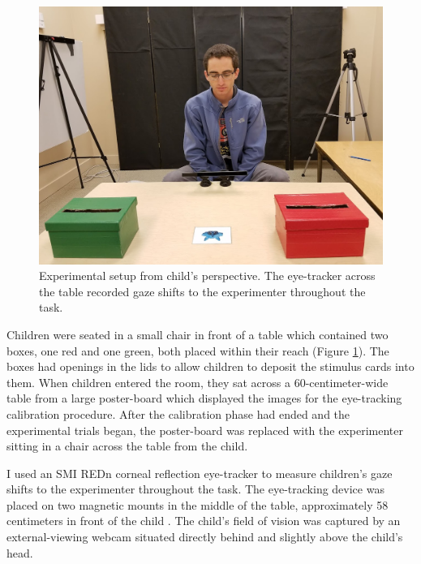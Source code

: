 \documentclass[floatsintext,man]{apa6}
\theoremstyle{definition}
\theoremstyle{definition}
\theoremstyle{definition}
\theoremstyle{remark}
\begin{document}
\begin{figure}
\centering
\includegraphics{../images/setup.jpg}
\caption{\label{fig:setup}Experimental setup from child's perspective. The
eye-tracker across the table recorded gaze shifts to the experimenter
throughout the task.}
\end{figure}

Children were seated in a small chair in front of a table which
contained two boxes, one red and one green, both placed within their
reach (Figure \ref{fig:setup}). The boxes had openings in the lids to
allow children to deposit the stimulus cards into them. When children
entered the room, they sat across a 60-centimeter-wide table from a
large poster-board which displayed the images for the eye-tracking
calibration procedure. After the calibration phase had ended and the
experimental trials began, the poster-board was replaced with the
experimenter sitting in a chair across the table from the child.

I used an SMI REDn corneal reflection eye-tracker to measure children's
gaze shifts to the experimenter throughout the task. The eye-tracking
device was placed on two magnetic mounts in the middle of the table,
approximately 58 centimeters in front of the child . The child's field
of vision was captured by an external-viewing webcam situated directly
behind and slightly above the child's head.
\end{document}
